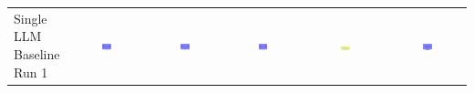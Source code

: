 \begin{table}
\begin{tabular}{@{}lccccc@{}}
    \makecell{Single LLM \\ Baseline \\ Run 1} & \includegraphics[width=0.13\textwidth]{./run_1/png/gpt-4o_results/MicrofluidicChip.png} & \includegraphics[width=0.13\textwidth]{./run_1/png/o1-preview_results/MicrofluidicChip.png} & \includegraphics[width=0.13\textwidth]{./run_1/png/claude-3-5-sonnet-20240620_results/MicrofluidicChip.png} & \includegraphics[width=0.13\textwidth]{./run_1/png/watsonx_meta-llama_llama-3-1-70b-instruct_results/MicrofluidicChip.png} & \includegraphics[width=0.13\textwidth]{./run_1/png/watsonx_meta-llama_llama-3-405b-instruct_results/MicrofluidicChip.png} \\

\end{tabular}
\end{table}
